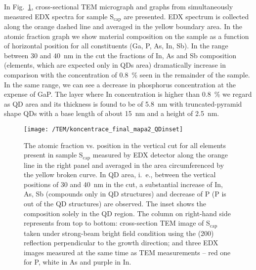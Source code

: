 In Fig.~\ref{fig:TEM}, cross-sectional TEM micrograph and graphs from simultaneously measured EDX spectra for sample S$_\mathrm{cap}$ are presented. EDX spectrum is collected along the orange dashed line and averaged in the yellow boundary area. In the atomic fraction graph we show material composition on the sample as a function of horizontal position for all constituents (Ga, P, As, In, Sb). In the range between 30 and 40~nm in the cut the fractions of In, As and Sb composition (elements, which are expected only in QDs area) dramatically increase in comparison with the concentration of 0.8~\% seen in the remainder of the sample. In the same range, we can see a decrease in phosphorus concentration at the expense of GaP. The layer where In concentration is higher than 0.8~\% we regard as QD area and its thickness is found to be of 5.8~nm with truncated-pyramid shape QDs with a base length of about 15~nm and a height of 2.5~nm. 
\begin{figure}
	\centering
	\texttt{[image: /TEM/koncentrace\_final\_mapa2\_QDinset]}
	\caption{The atomic fraction vs. position in the vertical cut for all elements present in sample S$_\mathrm{cap}$ measured by EDX detector along the orange line in the right panel and averaged in the area circumferenced by the yellow broken curve. In QD area, i.~e., between the vertical positions of 30 and 40~nm in the cut, a substantial increase of In, As, Sb (compounds only in QD structures) and decrease of P (P is out of the QD structures) are observed. The inset shows the composition solely in the QD region. The column on right-hand side represents from top to bottom: cross-section TEM image of S$_\mathrm{cap}$ taken under strong-beam bright field condition using the (200) reflection perpendicular to the growth direction; and three EDX images measured at the same time as TEM measurements -- red one for P, white in As and purple in In.}
	\label{fig:TEM}
\end{figure}

